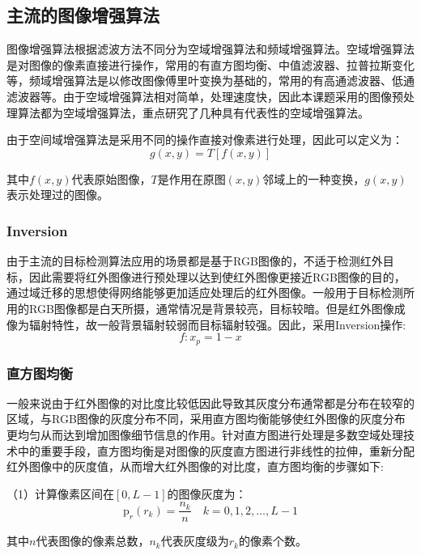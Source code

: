 \subsection{主流的图像增强算法}
图像增强算法根据滤波方法不同分为空域增强算法和频域增强算法。空域增强算法是对图像的像素直接进行操作，常用的有直方图均衡、中值滤波器、拉普拉斯变化等，频域增强算法是以修改图像傅里叶变换为基础的，常用的有高通滤波器、低通滤波器等。由于空域增强算法相对简单，处理速度快，因此本课题采用的图像预处理算法都为空域增强算法，重点研究了几种具有代表性的空域增强算法。

由于空间域增强算法是采用不同的操作直接对像素进行处理，因此可以定义为：
\begin{equation}
  g(x, y)=T[f(x, y)]
\end{equation}

其中$f(x, y)$代表原始图像，$T$是作用在原图$(x, y)$邻域上的一种变换，$g(x, y)$表示处理过的图像。

\subsubsection{Inversion}
由于主流的目标检测算法应用的场景都是基于RGB图像的，不适于检测红外目标，因此需要将红外图像进行预处理以达到使红外图像更接近RGB图像的目的，通过域迁移的思想使得网络能够更加适应处理后的红外图像。一般用于目标检测所用的RGB图像都是白天所摄，通常情况是背景较亮，目标较暗。但是红外图像成像为辐射特性，故一般背景辐射较弱而目标辐射较强。因此，采用Inversion操作:
\begin{equation}
  f: x_{p}=1-x
\end{equation}

\subsubsection{直方图均衡}
一般来说由于红外图像的对比度比较低因此导致其灰度分布通常都是分布在较窄的区域，与RGB图像的灰度分布不同，采用直方图均衡能够使红外图像的灰度分布更均匀从而达到增加图像细节信息的作用。针对直方图进行处理是多数空域处理技术中的重要手段，直方图均衡是对图像的灰度直方图进行非线性的拉伸，重新分配红外图像中的灰度值，从而增大红外图像的对比度，直方图均衡的步骤如下: 

（1）计算像素区间在$[0,L-1]$的图像灰度为：
\begin{equation}
  \mathrm{p}_{r}\left(r_{k}\right)=\frac{n_{k}}{n} \quad k=0,1,2, \ldots, L-1
\end{equation}

其中$n$代表图像的像素总数，$n_{k}$代表灰度级为$r_{k}$的像素个数。

